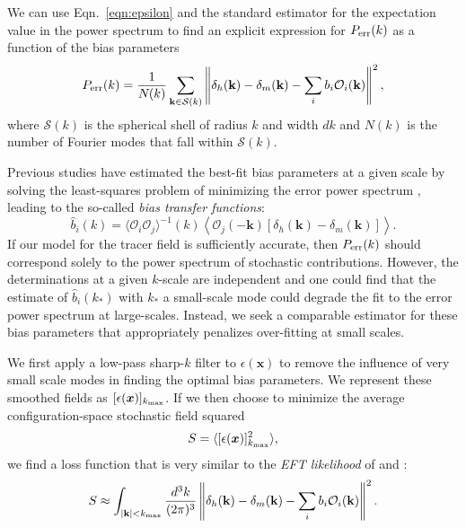 \documentclass[fleqn,usenatbib]{mnras}
\newcommand{\bx}{\boldsymbol x}
\newcommand{\bk}{\textbf{k}}
\begin{document}
We can use Eqn.~\ref{eqn:epsilon} and the standard estimator for the expectation value in the power spectrum to find an explicit expression for $P_{\rm err}(k)$ as a function of the bias parameters 
\begin{equation}
    P_{\rm err} (k) = \frac{1}{N_{\rm }(k)} \sum_{\bk \in \mathcal{S}(k)} \left \| \delta_h (\bk) - \delta_m (\bk) - \sum_i b_i \mathcal{O}_i (\bk) \right \|^2,
\end{equation}
where $\mathcal{S}(k)$ is the spherical shell of radius $k$ and width $dk$ and $N(k)$ is the number of Fourier modes that fall within $\mathcal{S}(k)$. \par 
Previous studies have estimated the best-fit bias parameters at a given scale by solving the least-squares problem of minimizing the error power spectrum \citep{Schmittfull_2019}, leading to the so-called \emph{bias transfer functions}:
\begin{equation}
\label{eqn:bhatold}
    \hat{b}_i (k) = \langle \mathcal{O}_i \mathcal{O}_j \rangle^{-1}(k) \left \langle \mathcal{O}_j(-\bk) \left [ \delta_h(\bk)  - \delta_m(\bk)  \right]\right \rangle.
\end{equation}
If our model for the tracer field is sufficiently accurate, then $P_{\rm err}(k)$ should correspond solely to the power spectrum of stochastic contributions. However, the determinations at a given $k$-scale are independent and one could find that the estimate of $\hat{b}_i(k_*)$ with $k_*$ a small-scale mode could degrade the fit to the error power spectrum at large-scales. Instead, we seek a comparable estimator for these bias parameters that appropriately penalizes over-fitting at small scales. \par 
We first apply a low-pass sharp-$k$ filter to $\epsilon(\bx)$ to remove the influence of very small scale modes in finding the optimal bias parameters. We represent these smoothed fields as $[\epsilon(\bx)]_{k_{\rm max}}$. If we then choose to minimize the average configuration-space stochastic field squared 
\begin{equation}
    \label{eqn:lossfunc}
    S = \langle [\epsilon(\bx)]_{k_{\rm max}}^2 \rangle,
\end{equation}
we find a loss function that is very similar to the \emph{EFT likelihood} of \cite{Schmidt_2019} and \cite{Cabass_2020}:
\begin{equation}
    S  \approx \int_{|\bk| < k_{\rm max}} \frac{d^3k}{(2\pi)^3}  \left \| \delta_h (\bk) - \delta_m (\bk) - \sum_i b_i \mathcal{O}_i (\bk) \right \|^2 .
\end{equation}
\end{document}
